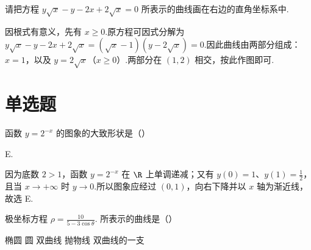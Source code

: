 \documentclass[UTF8,a4paper,oneside,11pt]{ctexbook}
\begin{document}
\begin{problem}

请把方程 \(y\sqrt{x} - y - 2x + 2\sqrt{x} = 0 \) 所表示的曲线画在右边的直角坐标系中.

\end{problem}

\begin{solution}
因根式有意义，先有 \(x\geqslant0\).原方程可因式分解为 \(y\sqrt{x}-y-2x+2\sqrt{x}=(\sqrt{x}-1)(y-2\sqrt{x})=0\).因此曲线由两部分组成：\(x=1\)，以及 \(y=2\sqrt{x}\)（\(x\geqslant0\)）.两部分在 \((1,2)\) 相交，按此作图即可.

\end{solution}

\section{单选题}

\begin{problem}

函数 \(y = 2^{-x} \) 的图象的大致形状是（\quad）

\choicesfive
    {}
    {}
    {}
    {}
    {}
\end{problem}

\begin{answer}
E.
\end{answer}

\begin{solution}
因为底数 \(2>1\)，函数 \(y=2^{-x}\) 在 \(\R\) 上单调递减；又有 \(y(0)=1\)、\(y(1)=\frac12\)，且当 \(x\to+\infty\) 时 \(y\to0\).所以图象应经过 \((0,1)\)，向右下降并以 \(x\) 轴为渐近线，故选 E.
\end{solution}

\begin{problem}

极坐标方程 \(\rho=\frac{10}{5-3\cos\theta} \). 所表示的曲线是（\quad）

\choicesfive
    {椭圆}
    {圆}
    {双曲线}
    {抛物线}
    {双曲线的一支}
\end{problem}
\end{document}

